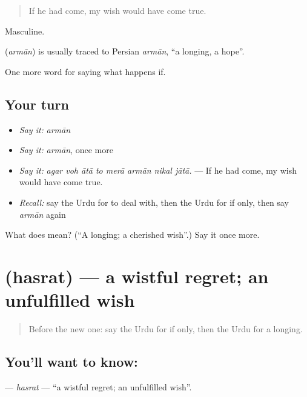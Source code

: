 \begin{quote}
If he had come, my wish would have come true.
\end{quote}

Masculine.

\begin{cousinweb}
\textbf{} (\emph{armān}) is usually traced to Persian \emph{armān}, \textquotedblleft{}a longing, a hope\textquotedblright{}.
\end{cousinweb}

\begin{grammarlens}[title={What you've built}]
One more word for saying what happens if.
\end{grammarlens}

\subsection*{Your turn}
\begin{itemize}
\raggedright
  \item \emph{Say it:} \emph{armān}
  \item \emph{Say it:} \emph{armān}, once more
  \item \emph{Say it:} \emph{agar voh ātā to merā armān nikal jātā.} — If he had come, my wish would have come true.
  \item \emph{Recall:} say the Urdu for to deal with, then the Urdu for if only, then say \emph{armān} again
\end{itemize}

\begin{tcolorbox}[breakable,colback=teal!4,colframe=teal!35!black,title={Before you move on}]
What does  mean? (\textquotedblleft{}A longing; a cherished wish\textquotedblright{}.) Say it once more.
\end{tcolorbox}
\section[\texorpdfstring{\ur{حسرت} (hasrat)}{حسرت (hasrat)}]{ (hasrat) — a wistful regret; an unfulfilled wish}

\label{lesson:UR-C369-hasrat}



\begin{quote}
Before the new one: say the Urdu for if only, then the Urdu for a longing.
\end{quote}

\subsection*{You'll want to know: }
\textbf{} — \emph{hasrat} — \textquotedblleft{}a wistful regret; an unfulfilled wish\textquotedblright{}.

